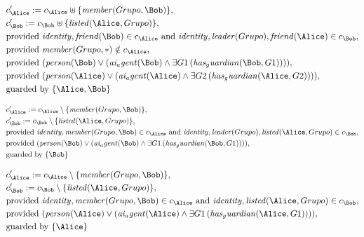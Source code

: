 \begin{align*}
&
c'_
{
\Alice
}
 := 
c_
{
\Alice
}
 \uplus 
\{
\mathit{
member
}
(
Grupo
,
\Bob
)
\}
,\\
&
c'_
{
\Bob
}
 := 
c_
{
\Bob
}
 \uplus 
\{
\mathit{
listed
}
(
\Alice
,
Grupo
)
\}
,\\
&
\text{provided } 
\mathit{
identity
}
,
\mathit{
friend
}
(
\Bob
)
 \in c_
{
\Alice
}
 \text{ and } 
\mathit{
identity
}
,
\mathit{
leader
}
(
Grupo
)
,
\mathit{
friend
}
(
\Alice
)
 \in c_
{
\Bob
}
,\\
&
\text{provided } 
\mathit{
member
}
(
Grupo
,
\ast
)
 \notin c_
{
\Alice
}
,\\
&
\text{provided } 
(
\mathit{
person
}
(
\Bob
)
\lor
(
\mathit{
ai_agent
}
(
\Bob
)
\land
\exists 
G1
\,(
\mathit{
has_guardian
}
(
\Bob
,
G1
)
)
)
)
,\\
&
\text{provided } 
(
\mathit{
person
}
(
\Alice
)
\lor
(
\mathit{
ai_agent
}
(
\Alice
)
\land
\exists 
G2
\,(
\mathit{
has_guardian
}
(
\Alice
,
G2
)
)
)
)
,\\
&
\text{guarded by } \{
\Alice
,
\Bob
\}
\end{align*}

\begin{align*}
&
c'_
{
\Alice
}
 := 
c_
{
\Alice
}
 \setminus 
\{
\mathit{
member
}
(
Grupo
,
\Bob
)
\}
,\\
&
c'_
{
\Bob
}
 := 
c_
{
\Bob
}
 \setminus 
\{
\mathit{
listed
}
(
\Alice
,
Grupo
)
\}
,\\
&
\text{provided } 
\mathit{
identity
}
,
\mathit{
member
}
(
Grupo
,
\Bob
)
 \in c_
{
\Alice
}
 \text{ and } 
\mathit{
identity
}
,
\mathit{
leader
}
(
Grupo
)
,
\mathit{
listed
}
(
\Alice
,
Grupo
)
 \in c_
{
\Bob
}
,\\
&
\text{provided } 
(
\mathit{
person
}
(
\Bob
)
\lor
(
\mathit{
ai_agent
}
(
\Bob
)
\land
\exists 
G1
\,(
\mathit{
has_guardian
}
(
\Bob
,
G1
)
)
)
)
,\\
&
\text{guarded by } \{
\Bob
\}
\end{align*}

\begin{align*}
&
c'_
{
\Alice
}
 := 
c_
{
\Alice
}
 \setminus 
\{
\mathit{
member
}
(
Grupo
,
\Bob
)
\}
,\\
&
c'_
{
\Bob
}
 := 
c_
{
\Bob
}
 \setminus 
\{
\mathit{
listed
}
(
\Alice
,
Grupo
)
\}
,\\
&
\text{provided } 
\mathit{
identity
}
,
\mathit{
member
}
(
Grupo
,
\Bob
)
 \in c_
{
\Alice
}
 \text{ and } 
\mathit{
identity
}
,
\mathit{
listed
}
(
\Alice
,
Grupo
)
 \in c_
{
\Bob
}
,\\
&
\text{provided } 
(
\mathit{
person
}
(
\Alice
)
\lor
(
\mathit{
ai_agent
}
(
\Alice
)
\land
\exists 
G1
\,(
\mathit{
has_guardian
}
(
\Alice
,
G1
)
)
)
)
,\\
&
\text{guarded by } \{
\Alice
\}
\end{align*}
